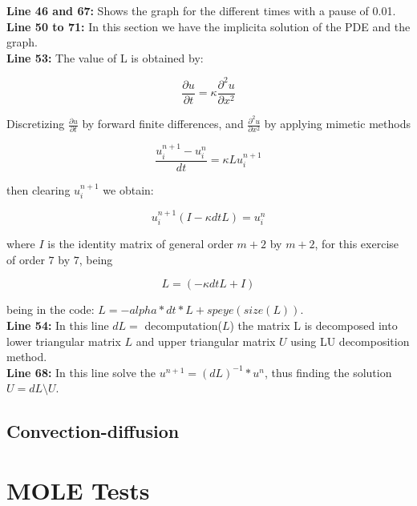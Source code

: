 \textbf{Line 46 and 67:} Shows the graph for the different times with a pause of 0.01. \\


\textbf{Line 50 to 71:} In this section we have the implicita solution of the PDE and the graph. \\

\textbf{Line 53:} The value of L is obtained by:

\begin{equation}
    \frac{\partial u}{\partial t} = \kappa \frac{\partial^{2} u}{\partial x^{2}}
\end{equation}

Discretizing $\frac{\partial u}{\partial t}$ by forward finite differences, and $\frac{\partial^{2} u}{\partial x^{2}}$ by applying mimetic methods

\begin{equation}
    \frac{u^{n+1}_{i} - u^{n}_{i} }{dt} = \kappa L 	u^{n+1}_{i}
\end{equation}

then clearing $u^{n+1}_{i}$ we obtain:


\begin{equation}
    u^{n+1}_{i}(I - \kappa dt L ) = u^{n}_{i}
\end{equation}

where $I$ is the identity matrix of general order $m+2$ by $m+2$, for this exercise of order $7$ by $7$, being

$$  L = (-\kappa dt L + I)$$

being in the code: $ L = -alpha*dt*L +speye(size(L))$.\\

\textbf{Line 54:} In this line $dL=$ decomputation($L$) the matrix L is decomposed into lower triangular matrix $L$ and upper triangular matrix $U$ using LU decomposition method.\\

\textbf{Line 68:} In this line solve the $u^{n+1} =(dL)^{-1}*u^{n}$, thus finding the solution $U=dL \setminus U$.\\



\section{Convection-diffusion}

\chapter{MOLE Tests}